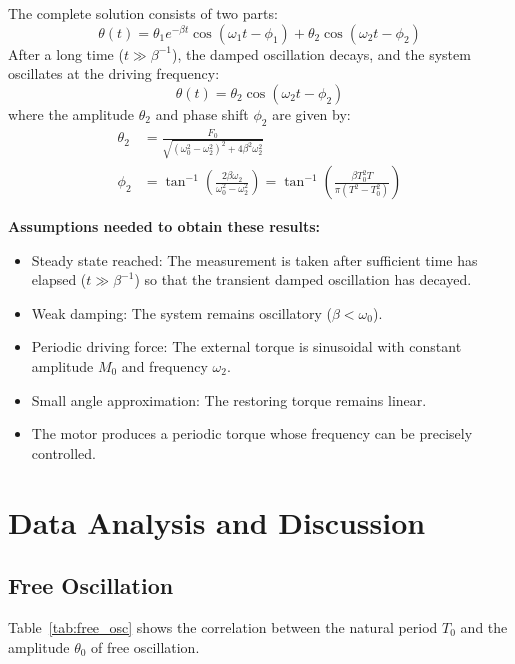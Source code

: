 \documentclass[12pt]{article}
\begin{document}
The complete solution consists of two parts:
\begin{equation}
\theta(t) = \theta_1 e^{-\beta t} \cos(\omega_1 t - \phi_1) + \theta_2 \cos(\omega_2 t - \phi_2)
\end{equation}
After a long time ($t \gg \beta^{-1}$), the damped oscillation decays, and the system oscillates at the driving frequency:
\begin{equation}
\theta(t) = \theta_2 \cos(\omega_2 t - \phi_2)
\end{equation}
where the amplitude $\theta_2$ and phase shift $\phi_2$ are given by:
\begin{align}
\theta_2 &= \frac{F_0}{\sqrt{(\omega_0^2 - \omega_2^2)^2 + 4\beta^2\omega_2^2}} \\
\phi_2 &= \tan^{-1}\left(\frac{2\beta\omega_2}{\omega_0^2 - \omega_2^2}\right) = \tan^{-1}\left(\frac{\beta T_0^2 T}{\pi(T^2 - T_0^2)}\right)
\end{align}

\textbf{Assumptions needed to obtain these results:}
\begin{itemize}[leftmargin=*]
\item Steady state reached: The measurement is taken after sufficient time has elapsed ($t \gg \beta^{-1}$) so that the transient damped oscillation has decayed.
\item Weak damping: The system remains oscillatory ($\beta < \omega_0$).
\item Periodic driving force: The external torque is sinusoidal with constant amplitude $M_0$ and frequency $\omega_2$.
\item Small angle approximation: The restoring torque remains linear.
\item The motor produces a periodic torque whose frequency can be precisely controlled.
\end{itemize}

\section{Data Analysis and Discussion}

\subsection{Free Oscillation}

Table~\ref{tab:free_osc} shows the correlation between the natural period $T_0$ and the amplitude $\theta_0$ of free oscillation.
\end{document}
